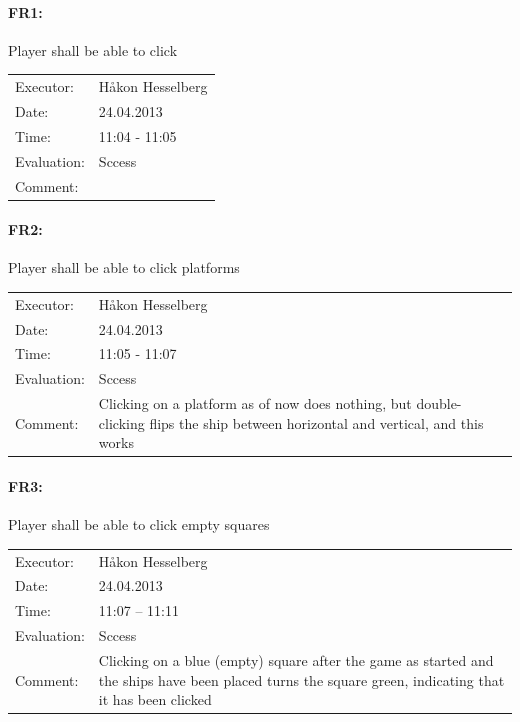 \documentclass[12pt, a4paper]{article}
\begin{document}
\paragraph{FR1:} Player shall be able to click \\
\begin{tabular}{  p{}  p{} }
    Executor: & Håkon Hesselberg  \\
    Date: & 24.04.2013 \\
    Time: & 11:04 - 11:05  \\
    Evaluation: & Sccess \\
    Comment: & \\
\end{tabular}

\paragraph{FR2:} Player shall be able to click platforms\\
\begin{tabular}{  p{}  p{} }
    Executor: & Håkon Hesselberg  \\
    Date: & 24.04.2013 \\
    Time: & 11:05 - 11:07  \\
    Evaluation: & Sccess \\
    Comment: & Clicking on a platform as of now does nothing, but
double-clicking flips the ship between horizontal and vertical, and this works \\ 
\end{tabular}

\paragraph{FR3:} Player shall be able to click empty squares\\
\begin{tabular}{  p{}  p{} }
    Executor: & Håkon Hesselberg  \\
    Date: & 24.04.2013 \\
    Time: & 11:07 – 11:11 \\
    Evaluation: & Sccess \\
    Comment: & Clicking on a blue (empty) square after the game as started and
the ships have been placed turns the square green, indicating that it has been
clicked\\
\end{tabular}
\end{document}
